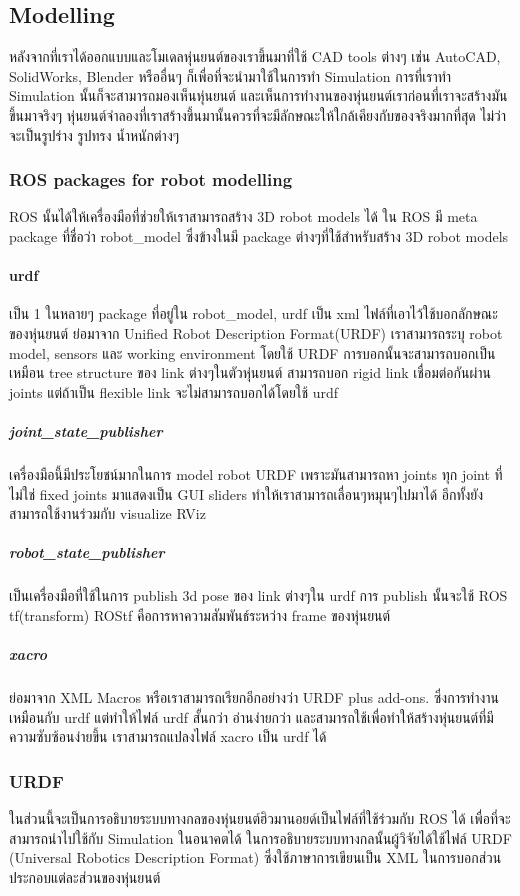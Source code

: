 \subsection{Modelling}
หลังจากที่เราได้ออกแบบและโมเดลหุ่นยนต์ของเราขึ้นมาที่ใช้ CAD tools ต่างๆ เช่น AutoCAD, SolidWorks, Blender
หรืออื่นๆ ก็เพื่อที่จะนำมาใช้ในการทำ Simulation การที่เราทำ Simulation นั้นก็จะสามารถมองเห็นหุ่นยนต์
และเห็นการทำงานของหุ่นยนต์เราก่อนที่เราจะสร้างมันขึ้นมาจริงๆ หุ่นยนต์จำลองที่เราสร้างขึ้นมานั้นควรที่จะมีลักษณะให้ใกล้เคียงกับของจริงมากที่สุด
ไม่ว่าจะเป็นรูปร่าง รูปทรง น้ำหนักต่างๆ 

\subsubsection{ROS packages for robot modelling}
ROS นั้นได้ให้เครื่องมือที่ช่วยให้เราสามารถสร้าง 3D robot models ได้
ใน ROS มี meta package ที่ชื่อว่า robot\_model ซึ่งข้างในมี package ต่างๆที่ใช้สำหรับสร้าง 3D robot models
        
\paragraph*{urdf}
เป็น 1 ในหลายๆ package ที่อยู่ใน robot\_model, urdf เป็น xml ไฟล์ที่เอาไว้ใช้บอกลักษณะของหุ่นยนต์ ย่อมาจาก Unified Robot Description Format(URDF)
เราสามารถระบุ robot model, sensors และ working environment โดยใช้ URDF การบอกนั้นจะสามารถบอกเป็นเหมือน tree structure ของ link ต่างๆในตัวหุ่นยนต์ สามารถบอก rigid link เชื่อมต่อกันผ่าน joints แต่ถ้าเป็น flexible link จะไม่สามารถบอกได้โดยใช้ urdf

\subparagraph*{joint\_state\_publisher}
เครื่องมือนี้มีประโยชน์มากในการ model robot URDF เพราะมันสามารถหา joints ทุก joint ที่ไม่ใช่ fixed joints มาแสดงเป็น GUI sliders ทำให้เราสามารถเลื่อนๆหมุนๆไปมาได้ อีกทั้งยังสามารถใช้งานร่วมกับ visualize RViz

\subparagraph*{robot\_state\_publisher}
เป็นเครื่องมือที่ใช้ในการ publish 3d pose ของ link ต่างๆใน urdf การ publish นั้นจะใช้ ROS tf(transform) ROStf คือการหาความสัมพันธ์ระหว่าง frame ของหุ่นยนต์

\subparagraph*{xacro}
ย่อมาจาก XML Macros หรือเราสามารถเรียกอีกอย่างว่า URDF plus add-ons. ซึ่งการทำงานเหมือนกับ urdf แต่ทำให้ไฟล์ urdf สั้นกว่า อ่านง่ายกว่า และสามารถใช้เพื่อทำให้สร้างหุ่นยนต์ที่มีความซับซ้อนง่ายขึ้น เราสามารถแปลงไฟล์ xacro เป็น urdf ได้

\subsubsection{URDF}
ในส่วนนี้จะเป็นการอธิบายระบบทางกลของหุ่นยนต์ฮิวมานอยด์เป็นไฟล์ที่ใช้ร่วมกับ ROS ได้ เพื่อที่จะสามารถนำไปใช้กับ Simulation ในอนาคตได้
ในการอธิบายระบบทางกลนั้นผู้วิจัยได้ใช้ไฟล์ URDF (Universal Robotics Description Format) ซึ่งใช้ภาษาการเขียนเป็น XML ในการบอกส่วนประกอบแต่ละส่วนของหุ่นยนต์

